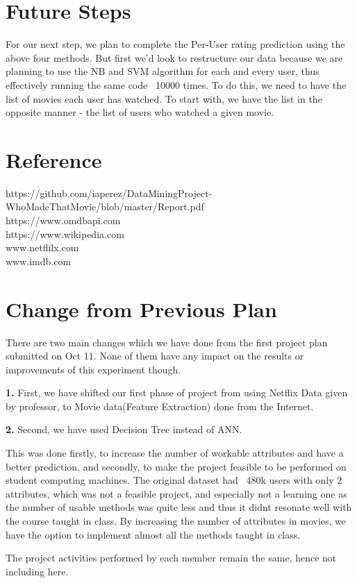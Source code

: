 \documentclass[11pt]{article}
\begin{document}
\section{Future Steps}
For our next step, we plan to complete the Per-User rating prediction using the above four methods. But first we'd look to restructure our data because we are planning to use the NB and SVM algorithm for each and every user, thus effectively running the same code ~10000 times. To do this, we need to have the list of movies each user has watched. To start with, we have the list in the opposite manner - the list of users who watched a given movie.\\


\section{Reference}
https://github.com/iaperez/DataMiningProject-WhoMadeThatMovie/blob/master/Report.pdf\\
https://www.omdbapi.com\\
https://www.wikipedia.com\\
www.netflilx.com\\
www.imdb.com\\

\appendix
\section{Change from Previous Plan}
There are two main changes which we have done from the first project plan submitted on Oct 11. None of them have any impact on the results or improvements of this experiment though.

	{\bfseries 1.} First, we have shifted our first phase of project from using Netflix Data given by professor, to Movie data(Feature Extraction) done from the Internet. 

	{\bfseries 2.} Second, we have used Decision Tree instead of ANN.
	
	This was done firstly, to increase the number of workable attributes and have a better prediction, and secondly, to make the project feasible to be performed on student computing machines. The original dataset had ~480k users with only 2 attributes, which was not a feasible project, and especially not a learning one as the number of usable methods was quite less and thus it didnt resonate well with the course taught in class. By increasing the number of attributes in movies, we have the option to implement almost all the methods taught in class.
	
    The project activities performed by each member remain the same, hence not including here.
\end{document}
